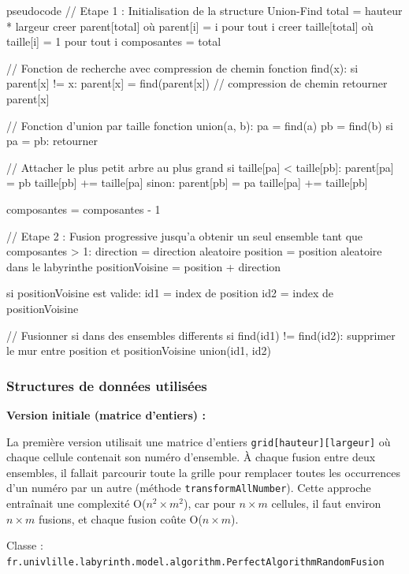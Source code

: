 \documentclass{butexFR}
\begin{document}
\begin{codeboxlang}{pseudocode}
// Etape 1 : Initialisation de la structure Union-Find
total = hauteur * largeur
creer parent[total] où parent[i] = i pour tout i
creer taille[total] où taille[i] = 1 pour tout i
composantes = total

// Fonction de recherche avec compression de chemin
fonction find(x):
    si parent[x] != x:
        parent[x] = find(parent[x])  // compression de chemin
    retourner parent[x]

// Fonction d'union par taille
fonction union(a, b):
    pa = find(a)
    pb = find(b)
    si pa = pb: retourner

    // Attacher le plus petit arbre au plus grand
    si taille[pa] < taille[pb]:
        parent[pa] = pb
        taille[pb] += taille[pa]
    sinon:
        parent[pb] = pa
        taille[pa] += taille[pb]

    composantes = composantes - 1

// Etape 2 : Fusion progressive jusqu'a obtenir un seul ensemble
tant que composantes > 1:
    direction = direction aleatoire
    position = position aleatoire dans le labyrinthe
    positionVoisine = position + direction

    si positionVoisine est valide:
        id1 = index de position
        id2 = index de positionVoisine

        // Fusionner si dans des ensembles differents
        si find(id1) != find(id2):
            supprimer le mur entre position et positionVoisine
            union(id1, id2)
\end{codeboxlang}

\subsubsection{Structures de données utilisées}

\textbf{Version initiale (matrice d'entiers) :}

La première version utilisait une matrice d'entiers \texttt{grid[hauteur][largeur]} où chaque cellule contenait son numéro d'ensemble. À chaque fusion entre deux ensembles, il fallait parcourir toute la grille pour remplacer toutes les occurrences d'un numéro par un autre (méthode \texttt{transformAllNumber}). Cette approche entraînait une complexité O($n^2 \times m^2$), car pour $n \times m$ cellules, il faut environ $n \times m$ fusions, et chaque fusion coûte O($n \times m$).

Classe : \texttt{fr.univlille.labyrinth.model.algorithm.PerfectAlgorithmRandomFusion}
\end{document}
